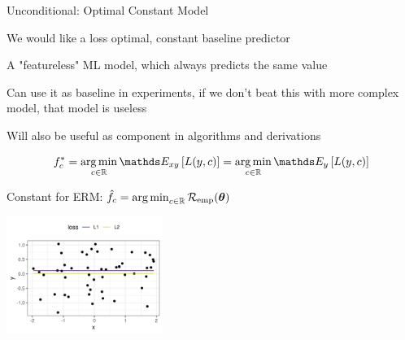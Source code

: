 \documentclass[11pt,compress,t,notes=noshow, xcolor=table]{beamer}
\begin{document}
\begin{vbframe}{Unconditional: Optimal Constant Model}

\begin{itemize}
{\footnotesize
\item We would like a loss optimal, constant baseline predictor
\item A "featureless" ML model, which always predicts the same value
\item Can use it as baseline in experiments, if we don't beat this
with more complex model, that model is useless
\item Will also be useful as component in algorithms and derivations



$$f_{c}^{\ast} = \argmin_{c \in \mathbb{R}} \E_{xy} \left[L(y,c)\right] = \argmin_{c \in \mathbb{R}} \E_{y} \left[L(y,c)\right]$$

\item Constant for ERM: $\hat{f}_c = \mathop{\mathrm{arg\,min}}_{c \in \mathbb{R}} \mathcal{R}_{\text{emp}}(\bm{\theta})$

}

\end{itemize}

\vspace*{-0.2cm}

\begin{center}
	\includegraphics[width = 0.38\textwidth]{figure/l1_vs_l2.png}
\end{center}
\end{vbframe}
\end{document}
